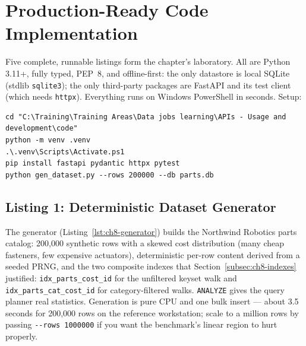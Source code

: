 \section{Production-Ready Code Implementation}
\label{sec:ch8-code}

Five complete, runnable listings form the chapter's laboratory. All are
Python 3.11+, fully typed, PEP~8, and offline-first: the only datastore is
local SQLite (stdlib \texttt{sqlite3}); the only third-party packages are
FastAPI and its test client (which needs \texttt{httpx}). Everything runs on
Windows PowerShell in seconds. Setup:

\begin{verbatim}
cd "C:\Training\Training Areas\Data jobs learning\APIs - Usage and development\code"
python -m venv .venv
.\.venv\Scripts\Activate.ps1
pip install fastapi pydantic httpx pytest
python gen_dataset.py --rows 200000 --db parts.db
\end{verbatim}

\subsection{Listing 1: Deterministic Dataset Generator}
\label{subsec:ch8-code-generator}

The generator (Listing~\ref{lst:ch8-generator}) builds the Northwind Robotics
parts catalog: 200{,}000 synthetic rows with a skewed cost distribution
(many cheap fasteners, few expensive actuators), deterministic per-row
content derived from a seeded PRNG, and the two composite indexes that
Section~\ref{subsec:ch8-indexes} justified: \texttt{idx\_parts\_cost\_id}
for the unfiltered keyset walk and \texttt{idx\_parts\_cat\_cost\_id} for
category-filtered walks. \texttt{ANALYZE} gives the query planner real
statistics. Generation is pure CPU and one bulk insert --- about 3.5 seconds
for 200{,}000 rows on the reference workstation; scale to a million rows by
passing \texttt{-{}-rows 1000000} if you want the benchmark's linear region
to hurt properly.

